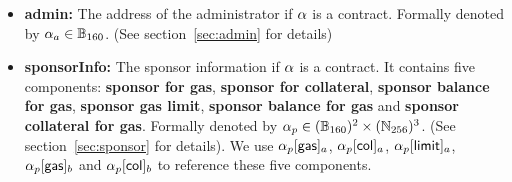 \begin{itemize}[nosep]
	
	
	\item {\bf admin:} The address of the administrator if $\mathbf{\alpha}$ is a contract.  Formally denoted by $\mathbf{\alpha}_a\in \mathbb{B}_{160}$. (See section~\ref{sec:admin} for details)
	
	\item {\bf sponsorInfo:} The sponsor information if $\mathbf{\alpha}$ is a contract. It contains five components: {\bf sponsor for gas}, {\bf sponsor for collateral}, {\bf sponsor balance for gas}, {\bf sponsor gas limit}, {\bf sponsor balance for gas} and {\bf sponsor collateral for gas}. Formally denoted by $\mathbf{\alpha}_p\in (\mathbb{B}_{160})^2\times (\mathbb{N}_{256})^3$. (See section~\ref{sec:sponsor} for details). We use $\mathbf{\alpha}_p[{\sf gas}]_a$, $\mathbf{\alpha}_p[{\sf col}]_a$, 
	$\mathbf{\alpha}_p[{\sf limit}]_a$, $\mathbf{\alpha}_p[{\sf gas}]_b$ and $\mathbf{\alpha}_p[{\sf col}]_b$ to reference these five components. 
	
	
	
\end{itemize}



